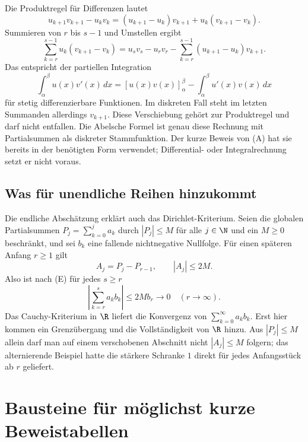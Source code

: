 Die Produktregel für Differenzen lautet
\[
 u_{k+1}v_{k+1}-u_kv_k
 =(u_{k+1}-u_k)v_{k+1}+u_k(v_{k+1}-v_k).
\]
Summieren von $r$ bis $s-1$ und Umstellen ergibt
\begin{equation}\tag{I}\label{abel:integration}
 \sum_{k=r}^{s-1}u_k(v_{k+1}-v_k)
 =u_sv_s-u_rv_r
  -\sum_{k=r}^{s-1}(u_{k+1}-u_k)v_{k+1}.
\end{equation}
Das entspricht der partiellen Integration
\[
 \int_\alpha^\beta u(x)v'(x)\,dx
 =[u(x)v(x)]_\alpha^\beta-\int_\alpha^\beta u'(x)v(x)\,dx
\]
für stetig differenzierbare Funktionen. Im diskreten Fall steht im
letzten Summanden allerdings $v_{k+1}$. Diese Verschiebung gehört zur
Produktregel und darf nicht entfallen. Die Abelsche Formel ist genau
diese Rechnung mit Partialsummen als diskreter Stammfunktion.
Der kurze Beweis von (A) hat sie bereits in der benötigten Form
verwendet; Differential- oder Integralrechnung setzt er nicht voraus.

\subsection*{Was für unendliche Reihen hinzukommt}

Die endliche Abschätzung erklärt auch das Dirichlet-Kriterium.
Seien die globalen Partialsummen $P_j=\sum_{k=0}^{j}a_k$ durch
$|P_j|\leq M$ für alle $j\in\N$ und ein $M\geq0$ beschränkt,
und sei $b_k$ eine fallende nichtnegative Nullfolge.
Für einen späteren Anfang $r\geq1$ gilt
\[
 A_j=P_j-P_{r-1},\qquad |A_j|\leq2M.
\]
Also ist nach (E) für jedes $s\geq r$
\[
 \left|\sum_{k=r}^{s}a_kb_k\right|\leq2Mb_r\longrightarrow0
 \quad(r\to\infty).
\]
Das Cauchy-Kriterium in $\R$ liefert die Konvergenz von
$\sum_{k=0}^{\infty}a_kb_k$. Erst hier kommen ein Grenzübergang und
die Vollständigkeit von $\R$ hinzu. Aus $|P_j|\leq M$ allein darf
man auf einem verschobenen Abschnitt nicht $|A_j|\leq M$ folgern;
das alternierende Beispiel hatte die stärkere Schranke $1$ direkt
für jedes Anfangsstück ab $r$ geliefert.

\section{Bausteine für möglichst kurze Beweistabellen}

